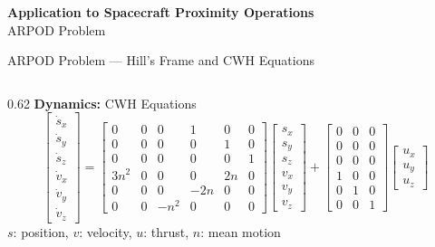 
\begin{frame}[plain]
  \vfill
  \begin{center}
    {\LARGE\color{slate900}\textbf{Application to Spacecraft Proximity Operations}}\\[8pt]
    {\color{slate700}ARPOD Problem}
  \end{center}
  \vfill
\end{frame}

\begin{frame}{ARPOD Problem --- Hill's Frame and CWH Equations}
  \begin{columns}[c]
    \begin{column}{0.62\textwidth}
      \smaller
      \textbf{Dynamics:} CWH Equations
      \vskip-4pt
      \scriptsize
      \[
        \begin{bmatrix} \dot{s}_x \\ \dot{s}_y \\ \dot{s}_z \\ \dot{v}_x \\ \dot{v}_y \\ \dot{v}_z \end{bmatrix}
        =
        \begin{bmatrix}
          0 & 0 & 0 & 1 & 0 & 0 \\
          0 & 0 & 0 & 0 & 1 & 0 \\
          0 & 0 & 0 & 0 & 0 & 1 \\
          3n^2 & 0 & 0 & 0 & 2n & 0 \\
          0 & 0 & 0 & -2n & 0 & 0 \\
          0 & 0 & -n^2 & 0 & 0 & 0
        \end{bmatrix}
        \begin{bmatrix} s_x \\ s_y \\ s_z \\ v_x \\ v_y \\ v_z \end{bmatrix}
        +
        \begin{bmatrix}
          0 & 0 & 0 \\
          0 & 0 & 0 \\
          0 & 0 & 0 \\
          1 & 0 & 0 \\
          0 & 1 & 0 \\
          0 & 0 & 1
        \end{bmatrix}
        \begin{bmatrix} u_x \\ u_y \\ u_z \end{bmatrix}
      \]
      \vskip0pt
      \scriptsize
      $s$: position,\; $v$: velocity,\; $u$: thrust,\; $n$: mean motion


\end{column}
\end{columns}
\end{frame}
